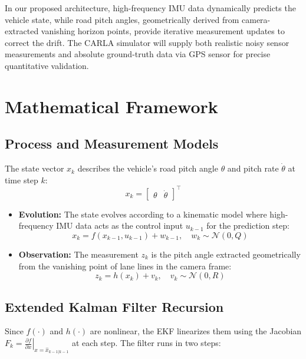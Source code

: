 \documentclass[12pt]{article}
\begin{document}
In our proposed architecture, high-frequency IMU data dynamically predicts the vehicle state, while road pitch angles, geometrically derived from camera-extracted vanishing horizon points, provide iterative measurement updates to correct the drift. The CARLA simulator will supply both realistic noisy sensor measurements and absolute ground-truth data via GPS sensor for precise quantitative validation.

\section{Mathematical Framework}

\subsection{Process and Measurement Models}

The state vector $x_k$ describes the vehicle's road pitch angle $\theta$ and pitch rate $\dot{\theta}$ at time step $k$:
\begin{equation}
x_k = \begin{bmatrix} \theta & \dot{\theta} \end{bmatrix}^\top
\end{equation}

\begin{itemize}
    \item \textbf{Evolution:} The state evolves according to a kinematic model where high-frequency IMU data acts as the control input $u_{k-1}$ for the prediction step:
    \begin{equation}
    x_k = f(x_{k-1}, u_{k-1}) + w_{k-1}, \quad w_k \sim \mathcal{N}(0, Q)
    \end{equation}
    
    \item \textbf{Observation:} The measurement $z_k$ is the pitch angle extracted geometrically from the vanishing point of lane lines in the camera frame:
    \begin{equation}
    z_k = h(x_k) + v_k, \quad v_k \sim \mathcal{N}(0, R)
    \end{equation}
\end{itemize}

\subsection{Extended Kalman Filter Recursion}

Since $f(\cdot)$ and $h(\cdot)$ are nonlinear, the EKF linearizes them using the Jacobian $F_k = \left. \frac{\partial f}{\partial x} \right|_{x=\hat{x}_{k-1|k-1}}$ at each step. The filter runs in two steps:\\
\\
\end{document}

